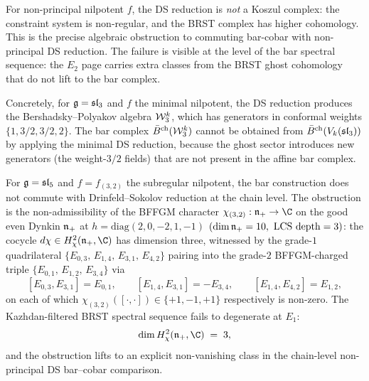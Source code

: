 \begin{remark}
For non-principal nilpotent $f$, the DS reduction is \emph{not} a
Koszul complex: the constraint system is non-regular, and the BRST
complex has higher cohomology. This is the precise algebraic
obstruction to commuting bar-cobar with non-principal DS reduction.
The failure is visible at the level of the bar spectral sequence:
the $E_2$ page carries extra classes from the BRST ghost cohomology
that do not lift to the bar complex.

Concretely, for $\mathfrak{g} = \mathfrak{sl}_3$ and $f$ the minimal nilpotent,
the DS reduction produces the Bershadsky--Polyakov algebra $\mathcal{W}^k_3$,
which has generators in conformal weights $\{1, 3/2, 3/2, 2\}$.
The bar complex $\bar{B}^{\mathrm{ch}}(\mathcal{W}^k_3)$ cannot be obtained from
$\bar{B}^{\mathrm{ch}}(V_k(\mathfrak{sl}_3))$ by applying the minimal DS reduction,
because the ghost sector introduces new generators (the weight-$3/2$
fields) that are not present in the affine bar complex.
\end{remark}

\begin{theorem}
\label{thm:non-principal-ds-bar-cobar-obstruction-32}
For $\mathfrak{g} = \mathfrak{sl}_5$ and $f = f_{(3,2)}$ the subregular
nilpotent, the bar construction does not commute with Drinfeld--Sokolov
reduction at the chain level. The obstruction is the non-admissibility
of the BFFGM character $\chi_{(3,2)} : \fn_+ \to \C$ on the good
even Dynkin $\mathfrak{n}_+$ at $h = \mathrm{diag}(2, 0, -2, 1, -1)$
$(\dim \mathfrak{n}_+ = 10,\ \mathrm{LCS\ depth} = 3)$: the cocycle
$d\chi \in H^2_\chi(\fn_+, \C)$ has dimension three, witnessed by
the grade-$1$ quadrilateral
$\{E_{0,3},\, E_{1,4},\, E_{3,1},\, E_{4,2}\}$ pairing into the
grade-$2$ BFFGM-charged triple
$\{E_{0,1},\, E_{1,2},\, E_{3,4}\}$ via
\[
 [E_{0,3}, E_{3,1}] = E_{0,1},\qquad
 [E_{1,4}, E_{3,1}] = -E_{3,4},\qquad
 [E_{1,4}, E_{4,2}] = E_{1,2},
\]
on each of which $\chi_{(3,2)}([\cdot,\cdot]) \in \{+1,-1,+1\}$
respectively is non-zero. The Kazhdan-filtered BRST spectral sequence
fails to degenerate at $E_1$:
\[
 \dim H^2_\chi(\fn_+, \C) \;=\; 3,
\]
and the obstruction lifts to an explicit non-vanishing class in
the chain-level non-principal DS bar--cobar comparison.
\end{theorem}


